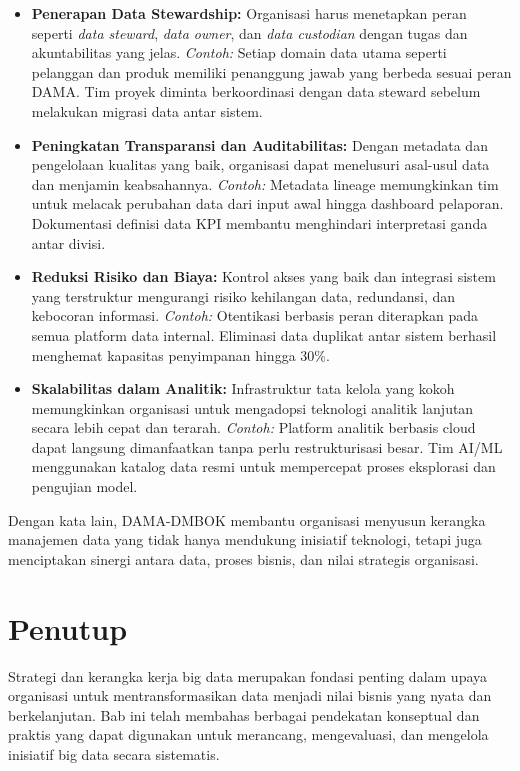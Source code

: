 \begin{itemize}
	\item \textbf{Penerapan Data Stewardship:} Organisasi harus menetapkan peran seperti \textit{data steward}, \textit{data owner}, dan \textit{data custodian} dengan tugas dan akuntabilitas yang jelas. \textit{Contoh:}  Setiap domain data utama seperti pelanggan dan produk memiliki penanggung jawab yang berbeda sesuai peran DAMA. Tim proyek diminta berkoordinasi dengan data steward sebelum melakukan migrasi data antar sistem.
	
	\item \textbf{Peningkatan Transparansi dan Auditabilitas:} Dengan metadata dan pengelolaan kualitas yang baik, organisasi dapat menelusuri asal-usul data dan menjamin keabsahannya. \textit{Contoh:}  Metadata lineage memungkinkan tim untuk melacak perubahan data dari input awal hingga dashboard pelaporan. Dokumentasi definisi data KPI membantu menghindari interpretasi ganda antar divisi.
	
	\item \textbf{Reduksi Risiko dan Biaya:} Kontrol akses yang baik dan integrasi sistem yang terstruktur mengurangi risiko kehilangan data, redundansi, dan kebocoran informasi. \textit{Contoh:}  Otentikasi berbasis peran diterapkan pada semua platform data internal. Eliminasi data duplikat antar sistem berhasil menghemat kapasitas penyimpanan hingga 30\%.
	
	\item \textbf{Skalabilitas dalam Analitik:} Infrastruktur tata kelola yang kokoh memungkinkan organisasi untuk mengadopsi teknologi analitik lanjutan secara lebih cepat dan terarah. \textit{Contoh:}  Platform analitik berbasis cloud dapat langsung dimanfaatkan tanpa perlu restrukturisasi besar. Tim AI/ML menggunakan katalog data resmi untuk mempercepat proses eksplorasi dan pengujian model.
\end{itemize}


Dengan kata lain, DAMA-DMBOK membantu organisasi menyusun kerangka manajemen data yang tidak hanya mendukung inisiatif teknologi, tetapi juga menciptakan sinergi antara data, proses bisnis, dan nilai strategis organisasi.

\section{Penutup}

Strategi dan kerangka kerja big data merupakan fondasi penting dalam upaya organisasi untuk mentransformasikan data menjadi nilai bisnis yang nyata dan berkelanjutan. Bab ini telah membahas berbagai pendekatan konseptual dan praktis yang dapat digunakan untuk merancang, mengevaluasi, dan mengelola inisiatif big data secara sistematis.

